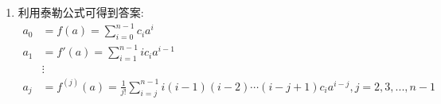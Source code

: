 \documentclass[a4paper,12pt]{ctexart}
\begin{document}
\begin{enumerate}[label=(\arabic{*})]
      
      \item 利用泰勒公式可得到答案:
      \begin{align*}
        a_0&=f(a)=\sum_{i=0}^{n-1}c_ia^i\\
        a_1&=f'(a)=\sum_{i=1}^{n-1}ic_ia^{i-1}\\
        &\vdots\\
        a_j&=f^{(j)}(a)=\frac{1}{j!}\sum_{i=j}^{n-1}i(i-1)(i-2)\cdots(i-j+1)c_ia^{i-j},j=2,3,...,n-1\\
      \end{align*}
    \end{enumerate} 
    
\end{document}
